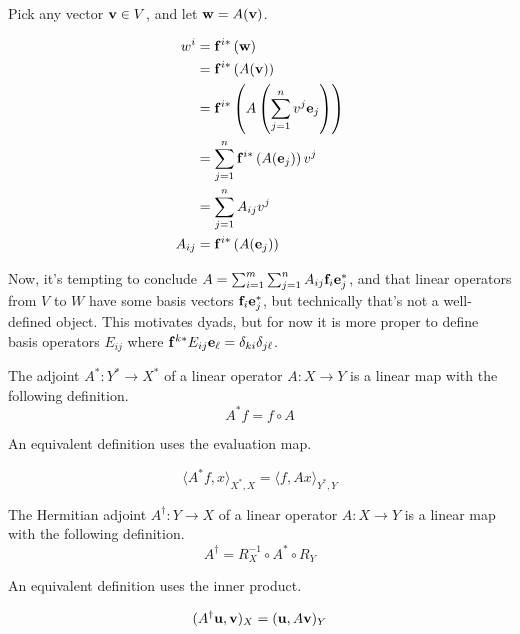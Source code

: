 Pick any vector $\vb{v} \in V$, and let $\vb{w} = A(\vb{v})$.

\begin{align*}
	w^{i} &= \vb{f}^{i*} \left( \vb{w} \right) \\
	&= \vb{f}^{i*} \left( A(\vb{v}) \right) \\
	&= \vb{f}^{i*} \left( A \left( \sum_{j = 1}^{n} v^{j} \vb{e}_{j} \right) \right) \\
	&= \sum_{j = 1}^{n} \vb{f}^{i*} \left(A( \vb{e}_{j}) \right) v^{j} \\
	&= \sum_{j = 1}^{n} A_{ij} v^{j} \\
	A_{ij} &= \vb{f}^{i*} \left(A( \vb{e}_{j}) \right)
\end{align*}

Now, it's tempting to conclude $A = \sum_{i = 1}^{m} \sum_{j = 1}^{n} A_{ij} \vb{f}_{i} \vb{e}_{j}^{*}$, and that linear operators from $V$ to $W$ have some basis vectors $\vb{f}_{i} \vb{e}_{j}^{*}$, but technically that's not a well-defined object. This motivates dyads, but for now it is more proper to define basis operators $E_{ij}$ where $\vb{f}^{k*} E_{ij} \vb{e}_{\ell} = \delta_{ki} \delta_{j\ell}$.

\begin{definition}[Adjoint]
	The adjoint $A^{*}: Y^{*} \rightarrow X^{*}$ of a linear operator $A: X \rightarrow Y$ is a linear map with the following definition.
	\begin{equation}
		A^{*} f = f \circ A
	\end{equation}
\end{definition}

An equivalent definition uses the evaluation map.

\begin{equation}
	\langle A^{*} f, x \rangle_{X^{*}, X} = \langle f, A x \rangle_{Y^{*}, Y}
\end{equation}

\begin{definition}
	The Hermitian adjoint $A^{\dagger}: Y \rightarrow X$ of a linear operator $A: X \rightarrow Y$ is a linear map with the following definition.
	\begin{equation}
		A^{\dagger} = R_{X}^{-1} \circ A^{*} \circ R_{Y}
	\end{equation}
\end{definition}

An equivalent definition uses the inner product.

\begin{equation}
	(A^{\dagger} \vb{u}, \vb{v})_{X} = (\vb{u}, A \vb{v})_{Y}
\end{equation}

